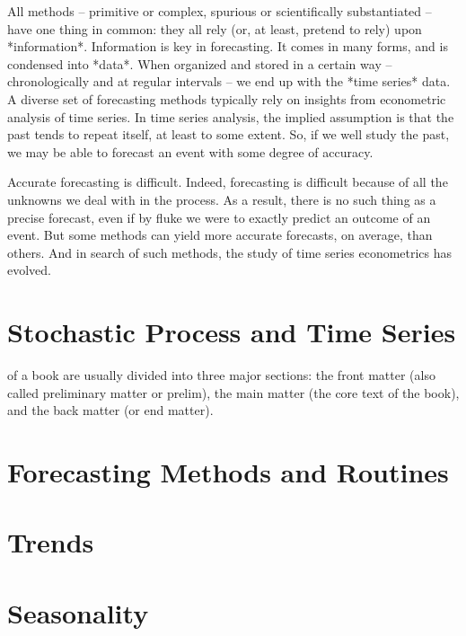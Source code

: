 \documentclass{tufte-book}
\begin{document}
	All methods -- primitive or complex, spurious or scientifically substantiated -- have one thing in common: they all rely (or, at least, pretend to rely) upon *information*. Information is key in forecasting. It comes in many forms, and is condensed into *data*. When organized and stored in a certain way -- chronologically and at regular intervals -- we end up with the *time series* data. A diverse set of forecasting methods typically rely on insights from econometric analysis of time series. In time series analysis, the implied assumption is that the past tends to repeat itself, at least to some extent. So, if we well study the past, we may be able to forecast an event with some degree of accuracy. 
	
	Accurate forecasting is difficult. Indeed, forecasting is difficult because of all the unknowns we deal with in the process. As a result, there is no such thing as a precise forecast, even if by fluke we were to exactly predict an outcome of an event. But some methods can yield more accurate forecasts, on average, than others. And in search of such methods, the study of time series econometrics has evolved. 
	
	\chapter{Stochastic Process and Time Series}
	\label{c2}
	
	
	 of a book are usually divided into three major
	sections: the front matter (also called preliminary matter or prelim), the
	main matter (the core text of the book), and the back matter (or end
	matter).

	
	\chapter{Forecasting Methods and Routines}
	\label{c3}
	
	
	\chapter{Trends}
	\label{c4}
	
	
	\chapter{Seasonality}
	\label{c5}
	
\end{document}
